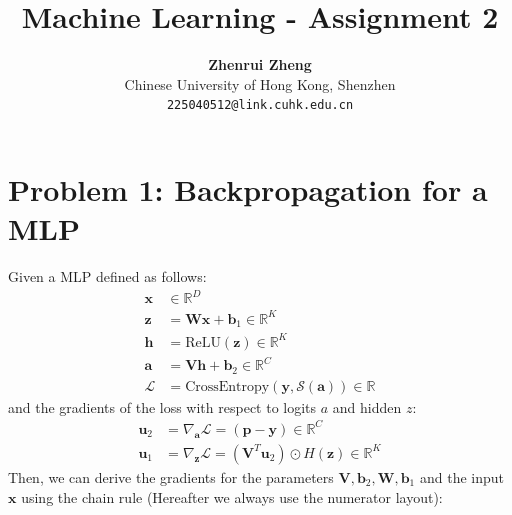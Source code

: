 \documentclass[11pt, a4paper, oneside]{memoir}
\title{\huge\textbf{Machine Learning - Assignment 2}\vspace{-0.5cm}}
\author{\textbf{Zhenrui Zheng} \vspace{0.5cm} \\ \small Chinese University of Hong Kong, Shenzhen \\ \small\texttt{225040512@link.cuhk.edu.cn}}
\date{}
\begin{document}
\begin{titlingpage}
    \maketitle
    \renewcommand{\contentsname}{\huge Contents \vspace{-1cm}}
    \begin{KeepFromToc} %
        \tableofcontents
    \end{KeepFromToc}
\end{titlingpage}

\chapter{Problem 1: Backpropagation for a MLP}
Given a MLP defined as follows:
\begin{align*}
    \boldsymbol{x} & \in \mathbb{R}^D                                                                  \\
    \boldsymbol{z} & = \mathbf{W}\boldsymbol{x} + \boldsymbol{b}_1 \in \mathbb{R}^K                    \\
    \boldsymbol{h} & = \text{ReLU}(\boldsymbol{z}) \in \mathbb{R}^K                                    \\
    \boldsymbol{a} & = \mathbf{V}\boldsymbol{h} + \boldsymbol{b}_2 \in \mathbb{R}^C                    \\
    \mathcal{L}    & = \text{CrossEntropy}(\boldsymbol{y}, \mathcal{S}(\boldsymbol{a})) \in \mathbb{R}
\end{align*}
and the gradients of the loss with respect to logits $a$ and hidden $z$:
\begin{align*}
    \boldsymbol{u}_2 & = \nabla_{\boldsymbol{a}} \mathcal{L} = (\boldsymbol{p}-\boldsymbol{y}) \in \mathbb{R}^C                         \\
    \boldsymbol{u}_1 & = \nabla_{\boldsymbol{z}} \mathcal{L} = (\mathbf{V}^T \boldsymbol{u}_2) \odot H(\boldsymbol{z}) \in \mathbb{R}^K
\end{align*}
Then, we can derive the gradients for the parameters $\mathbf{V}, \boldsymbol{b}_2, \mathbf{W}, \boldsymbol{b}_1$
and the input $\boldsymbol{x}$ using the chain rule (Hereafter we always use the numerator layout):
\end{document}
